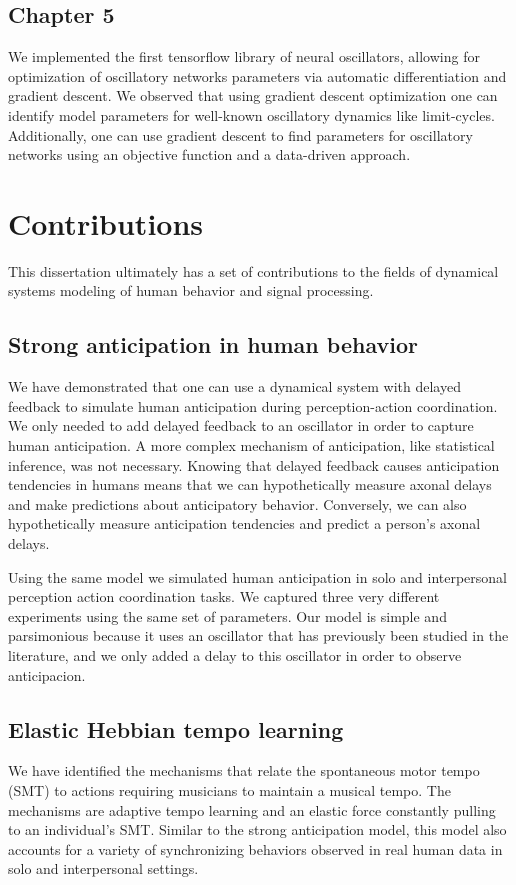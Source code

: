 \documentclass{report}
\begin{document}
\subsection{Chapter 5}
We implemented the first tensorflow library of neural oscillators, allowing for optimization of oscillatory networks parameters via automatic differentiation and gradient descent. We observed that using gradient descent optimization one can identify model parameters for well-known oscillatory dynamics like limit-cycles. Additionally, one can use gradient descent to find parameters for oscillatory networks using an objective function and a data-driven approach.

\section{Contributions}
This dissertation ultimately has a set of contributions to the fields of dynamical systems modeling of human behavior and signal processing. 

\subsection{Strong anticipation in human behavior}
We have demonstrated that one can use a dynamical system with delayed feedback to simulate human anticipation during perception-action coordination. We only needed to add delayed feedback to an oscillator in order to capture human anticipation. A more complex mechanism of anticipation, like statistical inference, was not necessary. Knowing that delayed feedback causes anticipation tendencies in humans means that we can hypothetically measure axonal delays and make predictions about anticipatory behavior. Conversely, we can also hypothetically measure anticipation tendencies and predict a person's axonal delays. 

Using the same model we simulated human anticipation in solo and interpersonal perception action coordination tasks. We captured three very different experiments using the same set of parameters. Our model is simple and parsimonious because it uses an oscillator that has previously been studied in the literature, and we only added a delay to this oscillator in order to observe anticipacion. 

\subsection{Elastic Hebbian tempo learning}
We have identified the mechanisms that relate the spontaneous motor tempo (SMT) to actions requiring musicians to maintain a musical tempo. The mechanisms are adaptive tempo learning and an elastic force constantly pulling to an individual's SMT. Similar to the strong anticipation model, this model also accounts for a variety of synchronizing behaviors observed in real human data in solo and interpersonal settings.
\end{document}
